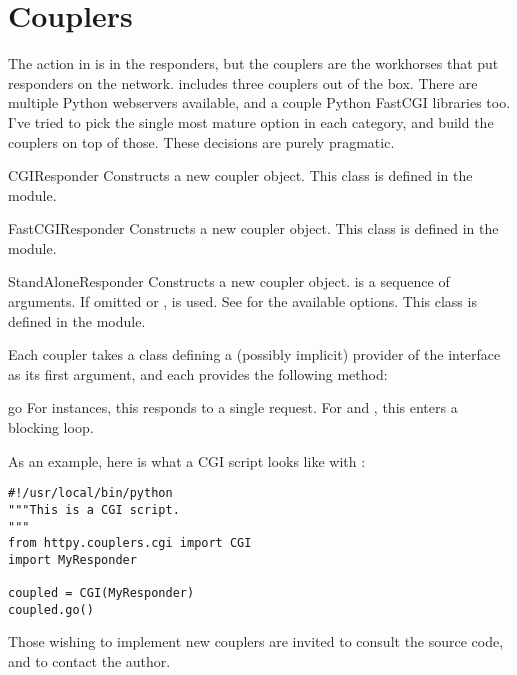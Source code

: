 \section{Couplers \label{couplers}}

The action in  is in the responders, but the couplers are the
workhorses that put responders on the network.  includes three
couplers out of the box. There are multiple Python webservers available, and a
couple Python FastCGI libraries too. I've tried to pick the single most mature
option in each category, and build the couplers on top of those. These decisions
are purely pragmatic.

\begin{classdesc}{CGI}{Responder} Constructs a new  coupler object.
This class is defined in the  module.
\end{classdesc}

\begin{classdesc}{FastCGI}{Responder} Constructs a new  coupler
object. This class is defined in the  module.
\end{classdesc}

\begin{classdesc}{StandAlone}{Responder} Constructs a new
 coupler object.  is a sequence of arguments. If
omitted or ,  is used. See  for the available options. This class
is defined in the  module. \end{classdesc}

Each coupler takes a class defining a (possibly implicit) provider of the
 interface as its first argument, and each provides the
following method:

\begin{methoddesc}{go}{} For  instances, this responds to a single
request. For  and , this enters a blocking
loop.\end{methoddesc}

As an example, here is what a CGI script looks like with :

\begin{verbatim}
#!/usr/local/bin/python
"""This is a CGI script.
"""
from httpy.couplers.cgi import CGI
import MyResponder

coupled = CGI(MyResponder)
coupled.go()
\end{verbatim}

Those wishing to implement new couplers are invited to consult the source code,
and to contact the author.